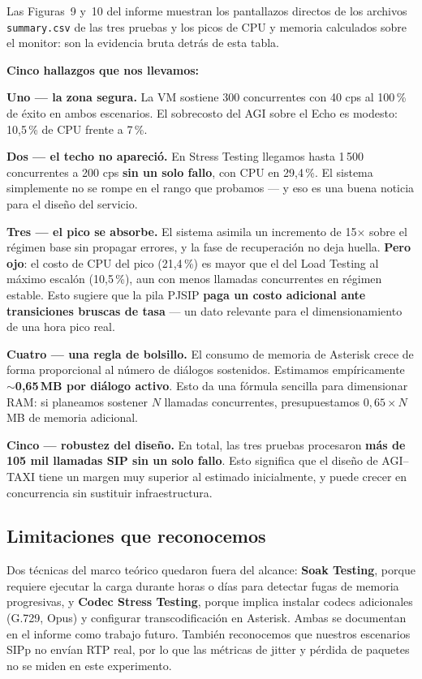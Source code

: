 \documentclass[11pt]{article}
\begin{document}
\medskip
\noindent Las Figuras~9 y~10 del informe muestran los pantallazos directos de los archivos \texttt{summary.csv} de las tres pruebas y los picos de CPU y memoria calculados sobre el monitor: son la evidencia bruta detr\'as de esta tabla.

\medskip
\noindent \textbf{Cinco hallazgos que nos llevamos:}

\medskip
\textbf{Uno --- la zona segura.} La VM sostiene 300 concurrentes con 40 cps al 100\,\% de \'exito en ambos escenarios. El sobrecosto del AGI sobre el Echo es modesto: 10,5\,\% de CPU frente a 7\,\%.

\medskip
\textbf{Dos --- el techo no apareci\'o.} En Stress Testing llegamos hasta 1\,500 concurrentes a 200 cps \textbf{sin un solo fallo}, con CPU en 29,4\,\%. El sistema simplemente no se rompe en el rango que probamos --- y eso es una buena noticia para el dise\~no del servicio.

\medskip
\textbf{Tres --- el pico se absorbe.} El sistema asimila un incremento de 15$\times$ sobre el r\'egimen base sin propagar errores, y la fase de recuperaci\'on no deja huella. \textbf{Pero ojo}: el costo de CPU del pico (21,4\,\%) es mayor que el del Load Testing al m\'aximo escal\'on (10,5\,\%), aun con menos llamadas concurrentes en r\'egimen estable. Esto sugiere que la pila PJSIP \textbf{paga un costo adicional ante transiciones bruscas de tasa} --- un dato relevante para el dimensionamiento de una hora pico real.

\medskip
\textbf{Cuatro --- una regla de bolsillo.} El consumo de memoria de Asterisk crece de forma proporcional al n\'umero de di\'alogos sostenidos. Estimamos emp\'iricamente \textbf{$\sim$0,65\,MB por di\'alogo activo}. Esto da una f\'ormula sencilla para dimensionar RAM: si planeamos sostener $N$ llamadas concurrentes, presupuestamos $0{,}65 \times N$ MB de memoria adicional.

\medskip
\textbf{Cinco --- robustez del dise\~no.} En total, las tres pruebas procesaron \textbf{m\'as de 105 mil llamadas SIP sin un solo fallo}. Esto significa que el dise\~no de AGI--TAXI tiene un margen muy superior al estimado inicialmente, y puede crecer en concurrencia sin sustituir infraestructura.

\subsection*{Limitaciones que reconocemos}

Dos t\'ecnicas del marco te\'orico quedaron fuera del alcance: \textbf{Soak Testing}, porque requiere ejecutar la carga durante horas o d\'ias para detectar fugas de memoria progresivas, y \textbf{Codec Stress Testing}, porque implica instalar codecs adicionales (G.729, Opus) y configurar transcodificaci\'on en Asterisk. Ambas se documentan en el informe como trabajo futuro. Tambi\'en reconocemos que nuestros escenarios SIPp no env\'ian RTP real, por lo que las m\'etricas de jitter y p\'erdida de paquetes no se miden en este experimento.
\end{document}
